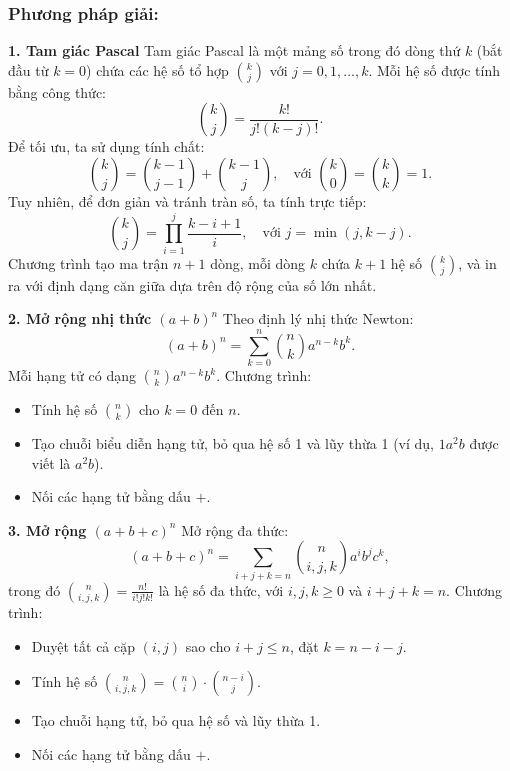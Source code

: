 \documentclass[a4paper,12pt]{article}
\begin{document}
\subsubsection*{Phương pháp giải:}

\textbf{1. Tam giác Pascal}
Tam giác Pascal là một mảng số trong đó dòng thứ \( k \) (bắt đầu từ \( k=0 \)) chứa các hệ số tổ hợp \( \binom{k}{j} \) với \( j = 0, 1, \ldots, k \). Mỗi hệ số được tính bằng công thức:
\[
\binom{k}{j} = \frac{k!}{j!(k-j)!}.
\]
Để tối ưu, ta sử dụng tính chất:
\[
\binom{k}{j} = \binom{k-1}{j-1} + \binom{k-1}{j}, \quad \text{với } \binom{k}{0} = \binom{k}{k} = 1.
\]
Tuy nhiên, để đơn giản và tránh tràn số, ta tính trực tiếp:
\[
\binom{k}{j} = \prod_{i=1}^j \frac{k-i+1}{i}, \quad \text{với } j = \min(j, k-j).
\]
Chương trình tạo ma trận \( n+1 \) dòng, mỗi dòng \( k \) chứa \( k+1 \) hệ số \( \binom{k}{j} \), và in ra với định dạng căn giữa dựa trên độ rộng của số lớn nhất.

\textbf{2. Mở rộng nhị thức \( (a + b)^n \)}
Theo định lý nhị thức Newton:
\[
(a + b)^n = \sum_{k=0}^n \binom{n}{k} a^{n-k} b^k.
\]
Mỗi hạng tử có dạng \( \binom{n}{k} a^{n-k} b^k \). Chương trình:
\begin{itemize}
    \item Tính hệ số \( \binom{n}{k} \) cho \( k = 0 \) đến \( n \).
    \item Tạo chuỗi biểu diễn hạng tử, bỏ qua hệ số 1 và lũy thừa 1 (ví dụ, \( 1a^2b \) được viết là \( a^2b \)).
    \item Nối các hạng tử bằng dấu \( + \).
\end{itemize}

\textbf{3. Mở rộng \( (a + b + c)^n \)}
Mở rộng đa thức:
\[
(a + b + c)^n = \sum_{i+j+k=n} \binom{n}{i,j,k} a^i b^j c^k,
\]
trong đó \( \binom{n}{i,j,k} = \frac{n!}{i!j!k!} \) là hệ số đa thức, với \( i, j, k \geq 0 \) và \( i + j + k = n \). Chương trình:
\begin{itemize}
    \item Duyệt tất cả cặp \( (i,j) \) sao cho \( i + j \leq n \), đặt \( k = n - i - j \).
    \item Tính hệ số \( \binom{n}{i,j,k} = \binom{n}{i} \cdot \binom{n-i}{j} \).
    \item Tạo chuỗi hạng tử, bỏ qua hệ số và lũy thừa 1.
    \item Nối các hạng tử bằng dấu \( + \).
\end{itemize}
\end{document}
